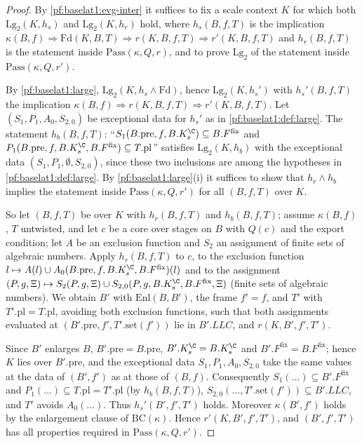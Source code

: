 \begin{proof}
By \cref{pf:baselat1:evg-inter} it suffices to fix a scale context $K$ for which both
$\mathrm{Lg}_2(K,h_s)$ and $\mathrm{Lg}_2(K,h_r)$ hold, where $h_s(B,f,T)$ is the implication
$\kappa(B,f)\Rightarrow\mathrm{Fd}(K,B,T)\Rightarrow r(K,B,f,T)\Rightarrow r'(K,B,f,T)$ and $h_r(B,f,T)$
is the statement inside $\mathrm{Pass}(\kappa,Q,r)$, and to prove $\mathrm{Lg}_2$ of the statement inside
$\mathrm{Pass}(\kappa,Q,r')$.

By \cref{pf:baselat1:large}, $\mathrm{Lg}_2(K,h_s\wedge\mathrm{Fd})$, hence $\mathrm{Lg}_2(K,h_s')$
with $h_s'(B,f,T)$ the implication $\kappa(B,f)\Rightarrow r(K,B,f,T)\Rightarrow r'(K,B,f,T)$. Let
$(S_1,P_1,A_0,S_{2,0})$ be exceptional data for $h_s'$ as in \cref{pf:baselat1:def:large}. The statement
$h_b(B,f,T)$: ``$S_1(B.\mathrm{pre},f,B.K_s^{\C})\subseteq B.F^{\mathrm{fix}}$ and
$P_1(B.\mathrm{pre},f,B.K_s^{\C},B.F^{\mathrm{fix}})\subseteq T.\mathrm{pl}$'' satisfies
$\mathrm{Lg}_2(K,h_b)$ with the exceptional data $(S_1,P_1,\emptyset,S_{2,0})$, since these two
inclusions are among the hypotheses in \cref{pf:baselat1:def:large}. By \cref{pf:baselat1:large}(i) it
suffices to show that $h_r\wedge h_b$ implies the statement inside $\mathrm{Pass}(\kappa,Q,r')$ for all
$(B,f,T)$ over $K$.

So let $(B,f,T)$ be over $K$ with $h_r(B,f,T)$ and $h_b(B,f,T)$; assume $\kappa(B,f)$, $T$ untwisted, and let
$c$ be a core over stages on $B$ with $Q(c)$ and the export condition; let $A$ be an exclusion function and
$S_2$ an assignment of finite sets of algebraic numbers. Apply $h_r(B,f,T)$ to $c$, to the exclusion function
$l\mapsto A(l)\cup A_0(B.\mathrm{pre},f,B.K_s^{\C},B.F^{\mathrm{fix}})(l)$ and to the assignment
$(P,g,\Xi)\mapsto S_2(P,g,\Xi)\cup S_{2,0}(P,g,B.K_s^{\C},B.F^{\mathrm{fix}},\Xi)$ (finite sets of algebraic
numbers). We obtain $B'$ with $\mathrm{Enl}(B,B')$, the frame $f'=f$, and $T'$ with
$T'.\mathrm{pl}=T.\mathrm{pl}$, avoiding both exclusion functions, such that both assignments evaluated at
$(B'.\mathrm{pre},f',T'.\mathrm{set}(f'))$ lie in $B'.\mathit{LLC}$, and $r(K,B',f',T')$.

Since $B'$ enlarges $B$, $B'.\mathrm{pre}=B.\mathrm{pre}$, $B'.K_s^{\C}=B.K_s^{\C}$ and
$B'.F^{\mathrm{fix}}=B.F^{\mathrm{fix}}$; hence $K$ lies over $B'.\mathrm{pre}$, and the exceptional data
$S_1,P_1,A_0,S_{2,0}$ take the same values at the data of $(B',f')$ as at those of $(B,f)$. Consequently
$S_1(\dots)\subseteq B'.F^{\mathrm{fix}}$ and $P_1(\dots)\subseteq T.\mathrm{pl}=T'.\mathrm{pl}$ (by
$h_b(B,f,T)$), $S_{2,0}(\dots,T'.\mathrm{set}(f'))\subseteq B'.\mathit{LLC}$, and $T'$ avoids
$A_0(\dots)$. Thus $h_s'(B',f',T')$ holds. Moreover $\kappa(B',f')$ holds by the enlargement clause of
$\mathrm{BC}(\kappa)$. Hence $r'(K,B',f',T')$, and $(B',f',T')$ has all properties required in
$\mathrm{Pass}(\kappa,Q,r')$.
\end{proof}

